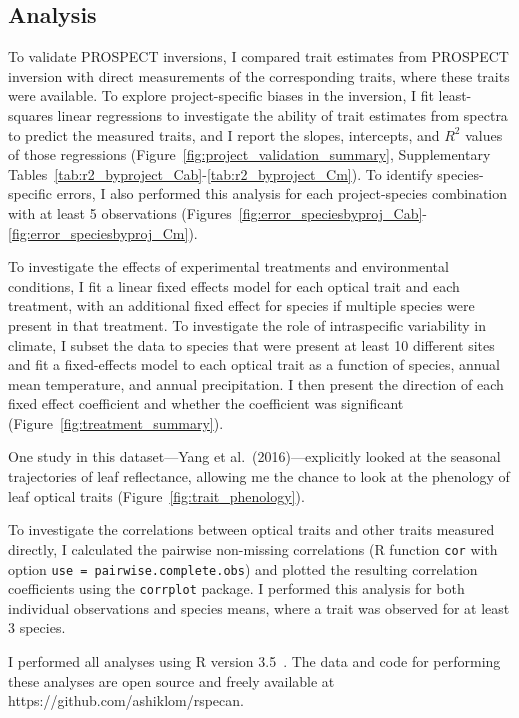 \subsection{Analysis}

To validate PROSPECT inversions, I compared trait estimates from PROSPECT inversion with direct measurements of the corresponding traits, where these traits were available.
To explore project-specific biases in the inversion, I fit least-squares linear regressions to investigate the ability of trait estimates from spectra to predict the measured traits, and I report the slopes, intercepts, and $R^2$ values of those regressions (Figure~\ref{fig:project_validation_summary}, Supplementary Tables~\ref{tab:r2_byproject_Cab}-\ref{tab:r2_byproject_Cm}).
To identify species-specific errors, I also performed this analysis for each project-species combination with at least 5 observations (Figures~\ref{fig:error_speciesbyproj_Cab}-\ref{fig:error_speciesbyproj_Cm}).

To investigate the effects of experimental treatments and environmental conditions, I fit a linear fixed effects model for each optical trait and each treatment, with an additional fixed effect for species if multiple species were present in that treatment.
To investigate the role of intraspecific variability in climate, I subset the data to species that were present at least 10 different sites and fit a fixed-effects model to each optical trait as a function of species, annual mean temperature, and annual precipitation.
I then present the direction of each fixed effect coefficient and whether the coefficient was significant (Figure~\ref{fig:treatment_summary}).

One study in this dataset---Yang et al.~(2016)\nocite{yang_2016_seasonal}---explicitly looked at the seasonal trajectories of leaf reflectance, allowing me the chance to look at the phenology of leaf optical traits (Figure~\ref{fig:trait_phenology}).

To investigate the correlations between optical traits and other traits measured directly, I calculated the pairwise non-missing correlations (R function \texttt{cor} with option \texttt{use = pairwise.complete.obs}) and plotted the resulting correlation coefficients using the \texttt{corrplot} package.
I performed this analysis for both individual observations and species means, where a trait was observed for at least 3 species.

I performed all analyses using R version 3.5~\cite{rstats}.
The data and code for performing these analyses are open source and freely available at https://github.com/ashiklom/rspecan.

